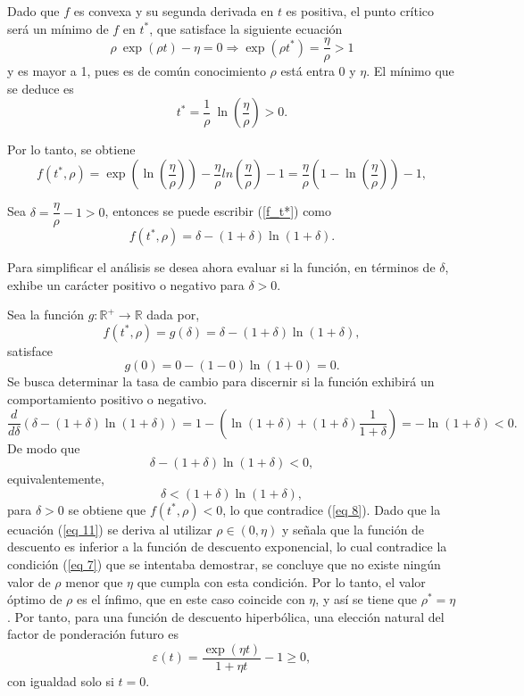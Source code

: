 \begin{exmpl}
Dado que $f$ es convexa y su segunda derivada en $t$ es positiva, el punto crítico será un mínimo de $f$ en $t^*$, que satisface la siguiente ecuación
$$ \rho \: \exp(\rho t) - \eta=0\Rightarrow
\exp(\rho t^*)= \dfrac{\eta}{\rho}>1$$
y es mayor a 1, pues es de común conocimiento $\rho$ está entra $0$ y $\eta$. El mínimo que se deduce es
\begin{equation}
\label{eq 9}
    t^*=\dfrac{1}{\rho} \: \ln \left(\dfrac{\eta}{\rho} \right)>0.
\end{equation}

Por lo tanto, se obtiene
\begin{equation}
\label{f_t*}
f(t^*, \rho)=\exp \left( \ln \left( \dfrac{\eta}{\rho}\right) \right) - \dfrac{\eta}{\rho} ln \left( \dfrac{\eta}{\rho} \right) -1 =\dfrac{\eta}{\rho} \left( 1-\ln \left( \dfrac{\eta}{\rho} \right) \right)-1,\end{equation}


Sea $\delta=\dfrac{\eta}{\rho} -1 >0$, entonces se puede escribir (\ref{f_t*}) como
\begin{equation}
\label{eq 10}
    f(t^*, \rho)= \delta - (1+\delta) \ln (1+ \delta).
\end{equation}

Para simplificar el análisis se desea ahora evaluar si la función, en términos de $\delta$, exhibe un carácter positivo o negativo para $\delta>0$. 

Sea la función $g:\mathbb{R}^+ \rightarrow \mathbb{R}$ dada por, 
$$f(t^*, \rho)=g(\delta)=\delta - (1+\delta) \ln (1+ \delta),$$
satisface
$$g(0)=0-(1-0) \ln(1+0)=0.$$
Se busca determinar la tasa de cambio para discernir si la función exhibirá un comportamiento positivo o negativo.
$$\dfrac{d}{d \delta}(\delta - (1+\delta) \ln (1+ \delta))=1-\left(\ln(1+ \delta)+(1+\delta) \dfrac{1}{1+ \delta} \right)=-\ln(1+\delta)<0.$$
%
De modo que 
$$\delta - (1+\delta) \ln (1+ \delta)<0,$$
equivalentemente,
\begin{equation}
\label{eq 11}
    \delta < (1+ \delta) \ln(1+\delta),
\end{equation}
para $\delta>0$ se obtiene que $f(t^*, \rho)<0$, lo que contradice (\ref{eq 8}). Dado que la ecuación (\ref{eq 11}) se deriva al utilizar $\rho \in (0, \eta)$ y señala que la función de descuento es inferior a la función de descuento exponencial, lo cual contradice la condición (\ref{eq 7}) que se intentaba demostrar, se concluye que no existe ningún valor de $\rho$ menor que $\eta$ que cumpla con esta condición. Por lo tanto, el valor óptimo de $\rho$ es el ínfimo, que en este caso coincide con $\eta$, y así se tiene que $\rho^* = \eta$. Por tanto, para una función de descuento hiperbólica, una elección natural del factor de ponderación futuro es
\begin{equation}
\label{eq 12}
    \varepsilon (t)= \dfrac{\exp(\eta t)}{1+ \eta t}-1 \geq 0,
\end{equation}
con igualdad solo si $t = 0$.
\end{exmpl}

